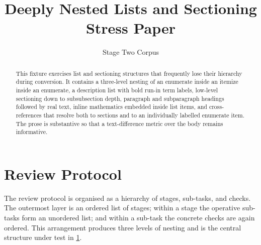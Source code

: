 \documentclass[11pt]{article}
\title{Deeply Nested Lists and Sectioning Stress Paper}
\author{Stage Two Corpus}
\date{}
\begin{document}
\maketitle

\begin{abstract}
This fixture exercises list and sectioning structures that frequently lose their
hierarchy during conversion. It contains a three-level nesting of an enumerate
inside an itemize inside an enumerate, a description list with bold run-in term
labels, low-level sectioning down to subsubsection depth, paragraph and
subparagraph headings followed by real text, inline mathematics embedded inside
list items, and cross-references that resolve both to sections and to an
individually labelled enumerate item. The prose is substantive so that a
text-difference metric over the body remains informative.
\end{abstract}

\section{Review Protocol}
\label{sec:protocol}

The review protocol is organised as a hierarchy of stages, sub-tasks, and
checks. The outermost layer is an ordered list of stages; within a stage the
operative sub-tasks form an unordered list; and within a sub-task the concrete
checks are again ordered. This arrangement produces three levels of nesting and
is the central structure under test in \cref{sec:protocol}.
\end{document}
